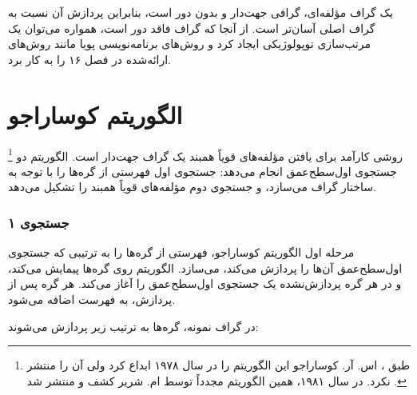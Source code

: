 یک گراف مؤلفه‌ای، گرافی جهت‌دار و بدون دور است،
بنابراین پردازش آن نسبت به گراف اصلی آسان‌تر است.
از آنجا که گراف فاقد دور است،
همواره می‌توان یک مرتب‌سازی توپولوژیکی ایجاد کرد و
روش‌های برنامه‌نویسی پویا مانند روش‌های
ارائه‌شده در فصل ۱۶ را به کار برد.

\section{الگوریتم کوساراجو}


\footnote{طبق \cite{aho83}،
اس. آر. کوساراجو این الگوریتم را در سال ۱۹۷۸ ابداع کرد
ولی آن را منتشر نکرد. در سال ۱۹۸۱، همین الگوریتم مجدداً
توسط ام. شریر کشف و منتشر شد \cite{sha81}.} روشی کارآمد
برای یافتن مؤلفه‌های قویاً همبند
یک گراف جهت‌دار است.
الگوریتم دو جستجوی اول‌سطح‌عمق انجام می‌دهد:
جستجوی اول فهرستی از گره‌ها را با توجه به ساختار گراف می‌سازد،
و جستجوی دوم مؤلفه‌های قویاً همبند را تشکیل می‌دهد.

\subsubsection{جستجوی ۱}

مرحله اول الگوریتم کوساراجو،
فهرستی از گره‌ها را به ترتیبی که جستجوی اول‌سطح‌عمق آن‌ها را پردازش می‌کند، می‌سازد.
الگوریتم روی گره‌ها پیمایش می‌کند،
و در هر گره پردازش‌نشده یک جستجوی اول‌سطح‌عمق را آغاز می‌کند.
هر گره پس از پردازش،
به فهرست اضافه می‌شود.

در گراف نمونه، گره‌ها
به ترتیب زیر پردازش می‌شوند:
\begin{center}
\end{center}

